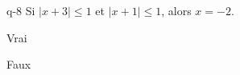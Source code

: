 \begin{truefalse}{q-8}
Si $|x+3|\leq 1$ et $|x+1|\leq 1$, alors $x=-2$.
\item* Vrai
\item Faux
\end{truefalse}

